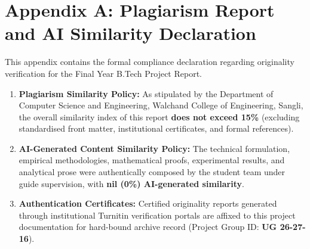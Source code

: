 \documentclass{article}
\begin{document}
	\pagebreak
	\appendix
	\section{Appendix A: Plagiarism Report and AI Similarity Declaration}
	\noindent
	This appendix contains the formal compliance declaration regarding originality verification for the Final Year B.Tech Project Report.
	
	\begin{enumerate}
		\item \textbf{Plagiarism Similarity Policy:} As stipulated by the Department of Computer Science and Engineering, Walchand College of Engineering, Sangli, the overall similarity index of this report \textbf{does not exceed 15\%} (excluding standardised front matter, institutional certificates, and formal references).
		\item \textbf{AI-Generated Content Similarity Policy:} The technical formulation, empirical methodologies, mathematical proofs, experimental results, and analytical prose were authentically composed by the student team under guide supervision, with \textbf{nil (0\%) AI-generated similarity}.
		\item \textbf{Authentication Certificates:} Certified originality reports generated through institutional Turnitin verification portals are affixed to this project documentation for hard-bound archive record (Project Group ID: \textbf{UG 26-27-16}).
	\end{enumerate}
\end{document}
